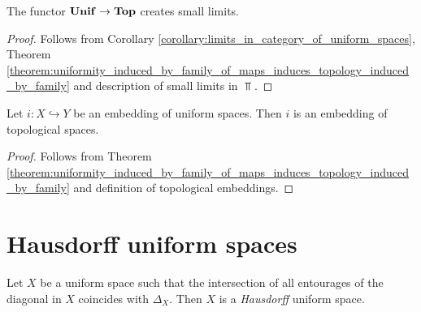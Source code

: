 \documentclass[10pt]{amsart}
\begin{document}
\begin{corollary}\label{corollary:topology_induced_by_uniformity_functor_preserves_small_limits}
	The functor $\mathbf{Unif} \rightarrow \mathbf{Top}$ creates small limits.
\end{corollary}
\begin{proof}
	Follows from Corollary \ref{corollary:limits_in_category_of_uniform_spaces}, Theorem \ref{theorem:uniformity_induced_by_family_of_maps_induces_topology_induced_by_family} and description of small limits in $\Top$.
\end{proof}

\begin{corollary}\label{corollary:topology_induced_by_uniformity_functor_preserves_subspaces}
	Let $i:X\hookrightarrow Y$ be an embedding of uniform spaces. Then $i$ is an embedding of topological spaces.
\end{corollary}
\begin{proof}
	Follows from Theorem \ref{theorem:uniformity_induced_by_family_of_maps_induces_topology_induced_by_family} and definition of topological embeddings.
\end{proof}

\section{Hausdorff uniform spaces}

\begin{definition}
	Let $X$ be a uniform space such that the intersection of all entourages of the diagonal in $X$ coincides with $\Delta_X$. Then $X$ is a \textit{Hausdorff} uniform space.
\end{definition}
\end{document}
